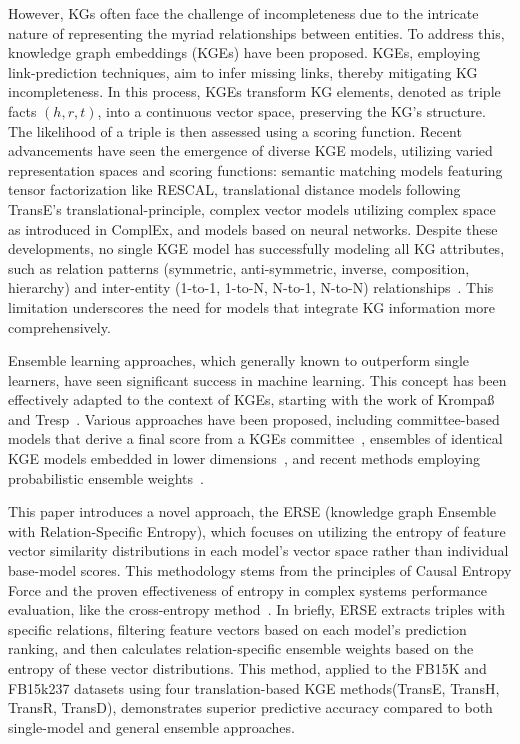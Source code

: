 \documentclass{article}
\begin{document}
However, KGs often face the challenge of incompleteness due to the intricate nature of representing the myriad relationships between entities. To address this, knowledge graph embeddings (KGEs) have been proposed. KGEs, employing link-prediction techniques, aim to infer missing links, thereby mitigating KG incompleteness. In this process, KGEs transform KG elements, denoted as triple facts $(h, r, t)$, into a continuous vector space, preserving the KG's structure. The likelihood of a triple is then assessed using a scoring function. Recent advancements have seen the emergence of diverse KGE models, utilizing varied representation spaces and scoring functions: semantic matching models featuring tensor factorization like RESCAL, translational distance models following TransE's translational-principle, complex vector models utilizing complex space as introduced in ComplEx, and models based on neural networks. Despite these developments, no single KGE model has successfully modeling all KG attributes, such as relation patterns (symmetric, anti-symmetric, inverse, composition, hierarchy) and inter-entity (1-to-1, 1-to-N, N-to-1, N-to-N) relationships~\cite{WANG20221041,choi2020approach}. This limitation underscores the need for models that integrate KG information more comprehensively.

Ensemble learning approaches, which generally known to outperform single learners, have seen significant success in machine learning. This concept has been effectively adapted to the context of KGEs, starting with the work of Krompaß and Tresp~\cite{krompass2015ensemble}. Various approaches have been proposed, including committee-based models that derive a final score from a KGEs committee~\cite{choi2020approach}, ensembles of identical KGE models embedded in lower dimensions~\cite{9533372}, and recent methods employing probabilistic ensemble weights~\cite{WANG20221041}.

This paper introduces a novel approach, the ERSE (knowledge graph Ensemble with Relation-Specific Entropy), which focuses on utilizing the entropy of feature vector similarity distributions in each model's vector space rather than individual base-model scores. This methodology stems from the principles of Causal Entropy Force and the proven effectiveness of entropy in complex systems performance evaluation, like the cross-entropy method~\cite{wissner2013causal, de2005tutorial}. In briefly, ERSE extracts triples with specific relations, filtering feature vectors based on each model's prediction ranking, and then calculates relation-specific ensemble weights based on the entropy of these vector distributions. This method, applied to the FB15K and FB15k237 datasets using four translation-based KGE methods(TransE, TransH, TransR, TransD), demonstrates superior predictive accuracy compared to both single-model and general ensemble approaches.
\end{document}
